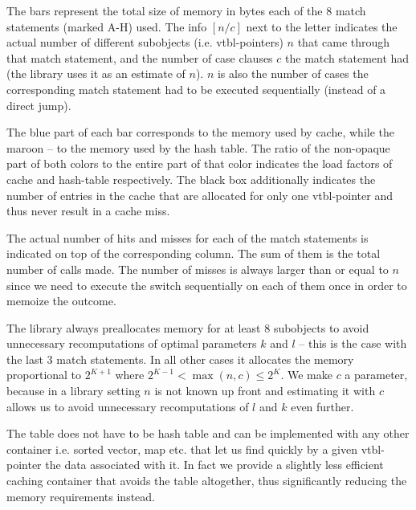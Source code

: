 The bars represent the total size of memory in bytes each of the 8 match 
statements (marked A-H) used. The info $[n/c]$ next to the letter indicates the 
actual number of different subobjects (i.e. vtbl-pointers) $n$ that came through 
that match statement, and the number of case clauses $c$ the match statement had 
(the library uses it as an estimate of $n$). $n$ is also the number of cases the 
corresponding match statement had to be executed sequentially (instead of a 
direct jump).

The blue part of each bar corresponds to the memory used by cache, while the 
maroon -- to the memory used by the hash table. The ratio of the non-opaque 
part of both colors to the entire part of that color indicates the load factors 
of cache and hash-table respectively. The black box additionally indicates the 
number of entries in the cache that are allocated for only one vtbl-pointer and 
thus never result in a cache miss. %

The actual number of hits and misses for each of the match statements is 
indicated on top of the corresponding column. The sum of them is the total 
number of calls made. %
The number of misses is always larger than or equal to $n$ since we need to 
execute the switch sequentially on each of them once in order to memoize the 
outcome.

The library always preallocates memory for at least 8 subobjects to avoid 
unnecessary recomputations of optimal parameters $k$ and $l$ -- this is the case 
with the last 3 match statements. In all other cases it allocates the 
memory proportional to $2^{K+1}$ where $2^{K-1} < \max(n,c) \le 2^{K}$. We make 
$c$ a parameter, because in a library setting $n$ is not known up front and 
estimating it with $c$ allows us to avoid unnecessary recomputations of $l$ and 
$k$ even further. 

The table does not have to be hash table and can be implemented with 
any other container i.e. sorted vector, map etc. that let us find quickly by a given 
vtbl-pointer the data associated with it. In fact we provide a slightly less 
efficient caching container that avoids the table altogether, thus significantly 
reducing the memory requirements instead.


